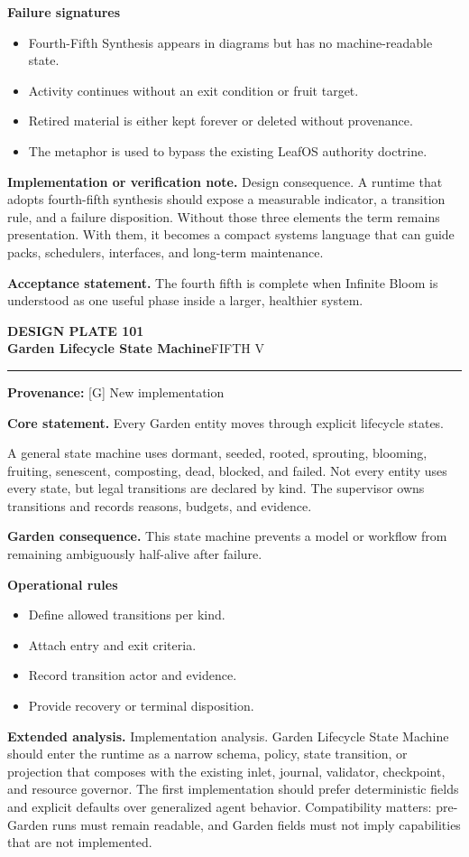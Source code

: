 \documentclass[10pt,letterpaper,oneside]{article}
\newcommand{\prov}[1]{\textcolor{gardenBlue}{\sffamily\footnotesize\textbf{Provenance:} #1}}
\newcommand{\platetitle}[3]{%
  \begin{minipage}[t][0.54in][t]{\textwidth}
  {\sffamily\bfseries\color{gardenDeep}\fontsize{9}{10}\selectfont DESIGN PLATE #1}\\[-1pt]
  {\sffamily\bfseries\color{gardenInk}\fontsize{16.5}{18}\selectfont #2}\hfill{\sffamily\color{gardenGreen}\large #3}
  \end{minipage}\vspace{-2pt}\hrule\vspace{5pt}}
\begin{document}
\textbf{Failure signatures}
\begin{itemize}
\item Fourth-Fifth Synthesis appears in diagrams but has no machine-readable state.
\item Activity continues without an exit condition or fruit target.
\item Retired material is either kept forever or deleted without provenance.
\item The metaphor is used to bypass the existing LeafOS authority doctrine.
\end{itemize}
\textbf{Implementation or verification note.} Design consequence. A runtime that adopts fourth-fifth synthesis should expose a measurable indicator, a transition rule, and a failure disposition. Without those three elements the term remains presentation. With them, it becomes a compact systems language that can guide packs, schedulers, interfaces, and long-term maintenance.

\begin{acceptbox}
\textbf{Acceptance statement.} The fourth fifth is complete when Infinite Bloom is understood as one useful phase inside a larger, healthier system.
\end{acceptbox}
\newpage
\platetitle{101}{Garden Lifecycle State Machine}{FIFTH V}
\prov{[G] New implementation}
\fontsize{8.85}{10.45}\selectfont
\begin{corebox}
\textbf{Core statement.} Every Garden entity moves through explicit lifecycle states.
\end{corebox}
A general state machine uses dormant, seeded, rooted, sprouting, blooming, fruiting, senescent, composting, dead, blocked, and failed. Not every entity uses every state, but legal transitions are declared by kind. The supervisor owns transitions and records reasons, budgets, and evidence.

\textbf{Garden consequence.} This state machine prevents a model or workflow from remaining ambiguously half-alive after failure.

\textbf{Operational rules}
\begin{itemize}
\item Define allowed transitions per kind.
\item Attach entry and exit criteria.
\item Record transition actor and evidence.
\item Provide recovery or terminal disposition.
\end{itemize}
\textbf{Extended analysis.} Implementation analysis. Garden Lifecycle State Machine should enter the runtime as a narrow schema, policy, state transition, or projection that composes with the existing inlet, journal, validator, checkpoint, and resource governor. The first implementation should prefer deterministic fields and explicit defaults over generalized agent behavior. Compatibility matters: pre-Garden runs must remain readable, and Garden fields must not imply capabilities that are not implemented.
\end{document}
